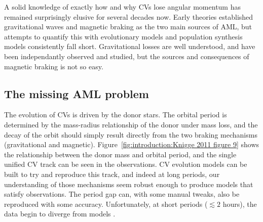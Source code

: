 A solid knowledge of exactly how and why CVs lose angular momentum has remained surprisingly elusive for several decades now. Early theories established gravitational waves and magnetic braking as the two main sources of AML, but attempts to quantify this with evolutionary models and population synthesis models consistently fall short. Gravitational losses are well understood, and have been independantly observed and studied, but the sources and consequences of magnetic braking is not so easy. 



\subsection{The missing AML problem}

The evolution of CVs is driven by the donor stars. The orbital period is determined by the mass-radius relationship of the donor under mass loss, and the decay of the orbit should simply result directly from the two braking mechanisms (gravitational and magnetic). Figure~\ref{fig:introduction:Knigge 2011 figure 9} shows the relationship between the donor mass and orbital period, and the single unified CV track can be seen in the observations. CV evolution models can be built to try and reproduce this track, and indeed at long periods, our understanding of those mechanisms seem robust enough to produce models that satisfy observations. The period gap can, with some manual tweaks, also be reproduced with some accuracy. Unfortunately, at short periods ($\lesssim 2$ hours), the data begin to diverge from models \citep{knigge2006,knigge11}. 

